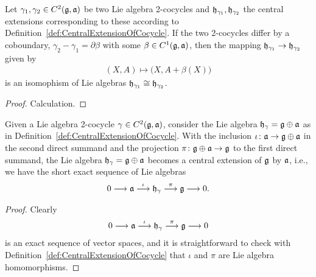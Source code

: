 \begin{lemma}
  \label{lem:CentralExtensionOfCocycleModCoboundary}
  \leanok
  Let $\gamma_1, \gamma_2 \in C^2(\mathfrak{g},\mathfrak{a})$ be two Lie algebra 2-cocycles
  and $\mathfrak{h}_{\gamma_1}, \mathfrak{h}_{\gamma_2}$ the central extensions corresponding
  to these according to Definition~\ref{def:CentralExtensionOfCocycle}.
  If the two 2-cocycles differ by a coboundary,
  $\gamma_2 - \gamma_1 = \partial \beta$ with some $\beta \in C^1(\mathfrak{g},\mathfrak{a})$,
  then the mapping $\mathfrak{h}_{\gamma_1} \to \mathfrak{h}_{\gamma_2}$ given by
  \begin{align*}
    (X,A) \mapsto \big( X, A + \beta(X) \big)
  \end{align*}
  is an isomophism of Lie algebras $\mathfrak{h}_{\gamma_1} \cong \mathfrak{h}_{\gamma_2}$.
\end{lemma}
\begin{proof}
  \leanok
  Calculation.
\end{proof}

\begin{lemma}
  \label{lem:OfCocycleIsCentralExtension}
  \leanok
  Given a Lie algebra 2-cocycle $\gamma \in C^2(\mathfrak{g},\mathfrak{a})$,
  consider the Lie algebra $\mathfrak{h}_\gamma = \mathfrak{g} \oplus \mathfrak{a}$ as
  in Definition~\ref{def:CentralExtensionOfCocycle}.
  With the inclusion $\iota \colon \mathfrak{a} \to \mathfrak{g} \oplus \mathfrak{a}$
  in the second direct summand and the
  projection $\pi \colon \mathfrak{g} \oplus \mathfrak{a} \to \mathfrak{g}$ to the first direct
  summand, the Lie algebra $\mathfrak{h}_\gamma = \mathfrak{g} \oplus \mathfrak{a}$ becomes a central
  extension of $\mathfrak{g}$ by $\mathfrak{a}$, i.e., we have the short exact sequence
  of Lie algebras
  \begin{align*}
    0 \longrightarrow \mathfrak{a}
      \overset{\iota}{\longrightarrow} \mathfrak{h}_\gamma
      \overset{\pi}{\longrightarrow} \mathfrak{g}
      \longrightarrow 0 .
  \end{align*}
\end{lemma}
\begin{proof}
  \leanok
  Clearly
  \begin{align*}
    0 \longrightarrow \mathfrak{a}
      \overset{\iota}{\longrightarrow} \mathfrak{h}_\gamma
      \overset{\pi}{\longrightarrow} \mathfrak{g}
      \longrightarrow 0
  \end{align*}
  is an exact sequence of vector spaces, and it is straightforward
  to check with Definition~\ref{def:CentralExtensionOfCocycle}
  that $\iota$ and $\pi$ are Lie algebra homomorphisms.
\end{proof}

